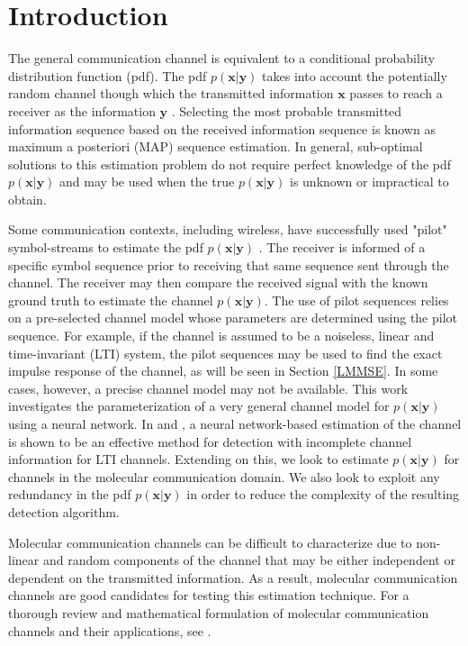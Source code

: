 \section{Introduction}

The general communication channel is equivalent to a conditional probability distribution function (pdf). The pdf $p(\mathbf{x}|\mathbf{y})$ takes into account the potentially random channel though which the transmitted information $\mathbf{x}$ passes to reach a receiver as the information $\mathbf{y}$ \cite[Ch.~7]{cover2012elements}. Selecting the most probable transmitted information sequence based on the received information sequence is known as maximum a posteriori (MAP) sequence estimation. In general, sub-optimal solutions to this estimation problem do not require perfect knowledge of the pdf $p(\mathbf{x}|\mathbf{y})$ and may be used when the true $p(\mathbf{x}|\mathbf{y})$ is unknown or impractical to obtain.

\par
Some communication contexts, including wireless, have successfully used "pilot" symbol-streams to estimate the pdf $p(\mathbf{x}|\mathbf{y})$ \cite{van1995channel}. The receiver is informed of a specific symbol sequence prior to receiving that same sequence sent through the channel. The receiver may then compare the received signal with the known ground truth to estimate the channel $p(\mathbf{x}|\mathbf{y})$.
The use of pilot sequences relies on a pre-selected channel model whose parameters are determined using the pilot sequence. For example, if the channel is assumed to be a noiseless, linear and time-invariant (LTI) system, the pilot sequences may be used to find the exact impulse response of the channel, as will be seen in Section \ref{LMMSE}. In some cases, however, a precise channel model may not be available. This work investigates the parameterization of a very general channel model for $p(\mathbf{x}|\mathbf{y})$ using a neural network. In \cite{shlezinger2019viterbinet} and \cite{shlezinger2020datadriven}, a neural network-based estimation of the channel is shown to be an effective method for detection with incomplete channel information for LTI channels.
 Extending on this, we look to estimate $p(\mathbf{x}|\mathbf{y})$ for channels in the molecular communication domain.
 We also look to exploit any redundancy in the pdf $p(\mathbf{x}|\mathbf{y})$ in order to reduce the complexity of the resulting detection algorithm.
\par
Molecular communication channels can be difficult to characterize due to non-linear and random components of the channel that may be either independent or dependent on the transmitted information. As a result, molecular communication channels are good candidates for testing this estimation technique. For a thorough review and mathematical formulation of molecular communication channels and their applications, see \cite{jamali2019channel}. 

